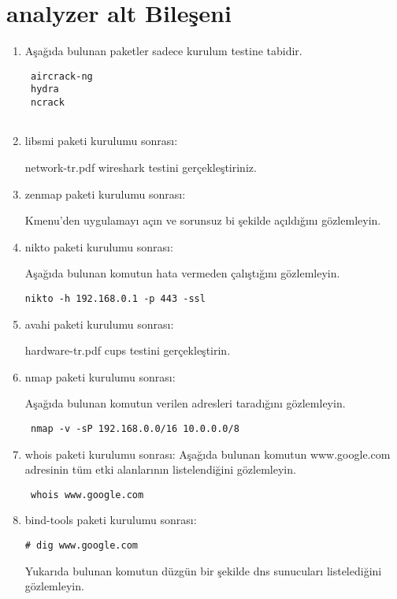 \documentclass[a4paper,10pt]{article}
\begin{document}
\section{analyzer alt Bileşeni}
\begin{enumerate}
\item Aşağıda bulunan paketler sadece kurulum testine tabidir.
\begin{verbatim}
 aircrack-ng
 hydra
 ncrack
 
\end{verbatim}
\item libsmi paketi kurulumu sonrası:

network-tr.pdf wireshark testini gerçekleştiriniz.

\item zenmap paketi kurulumu sonrası:

Kmenu'den uygulamayı açın ve sorunsuz bi şekilde açıldığını gözlemleyin.

\item nikto paketi kurulumu sonrası:

Aşağıda bulunan komutun hata vermeden çalıştığını gözlemleyin.
\begin{verbatim}
nikto -h 192.168.0.1 -p 443 -ssl 
\end{verbatim}


\item avahi paketi kurulumu sonrası:

hardware-tr.pdf cups testini gerçekleştirin.

\item nmap paketi kurulumu sonrası:

Aşağıda bulunan komutun verilen adresleri taradığını gözlemleyin.
\begin{verbatim}
 nmap -v -sP 192.168.0.0/16 10.0.0.0/8
\end{verbatim}

 
\item whois paketi kurulumu sonrası:
Aşağıda bulunan komutun www.google.com adresinin tüm etki alanlarının listelendiğini gözlemleyin.
\begin{verbatim}
 whois www.google.com
\end{verbatim}


\item bind-tools paketi kurulumu sonrası:

\begin{verbatim}
# dig www.google.com
\end{verbatim}
Yukarıda bulunan komutun düzgün bir şekilde dns sunucuları listelediğini gözlemleyin.


\end{enumerate}
\end{document}

